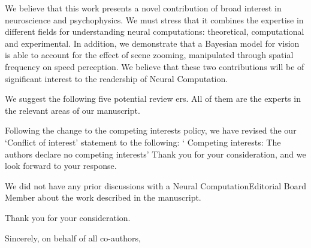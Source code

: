 \documentclass[stdletter,8pt,dateno]{newlfm}%
\newcommand{\Journal}{Neural Computation}%
\begin{document}
We believe that this work presents a novel contribution of broad interest in neuroscience and psychophysics. We must stress that it combines the expertise in different fields for understanding neural computations: theoretical, computational and experimental. In addition, we demonstrate that a Bayesian model for vision is able to account for the effect of scene zooming, manipulated through spatial frequency on speed perception. We believe that these two contributions will be of significant interest to the readership of \Journal.


We  suggest  the  following  five  potential  review
ers.  All  of  them  are  the  experts  in  the  
relevant areas of our manuscript. 


Following the change to the competing interests policy, we have revised the our ‘Conflict of interest’ statement to the following: 
‘
Competing interests: The authors declare no competing interests’
Thank you for your consideration, and we look forward to your response. 

We did not have any prior discussions with 
a \Journal Editorial Board Member 
about the work described in the manuscript. 

Thank you for your consideration.%


Sincerely, on behalf of all co-authors, 

\end{document}
